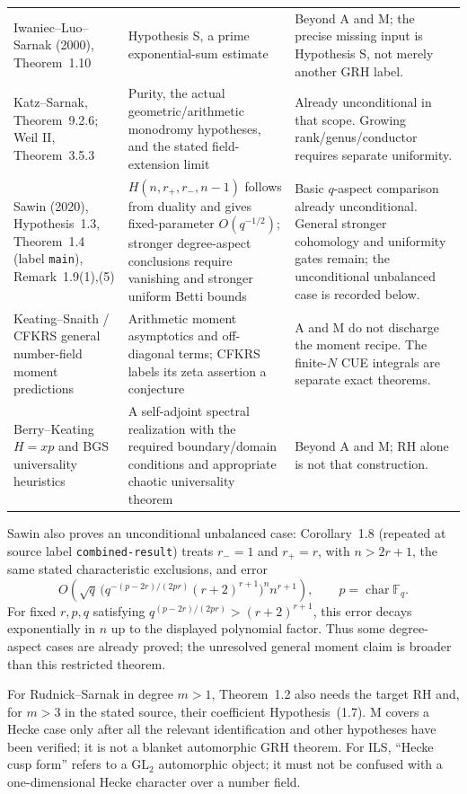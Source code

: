 \begin{longtable}{p{}p{}p{}}
Iwaniec--Luo--Sarnak (2000), Theorem~1.10 & Hypothesis S, a prime exponential-sum estimate & Beyond A and M; the precise missing input is Hypothesis S, not merely another GRH label.\\
Katz--Sarnak, Theorem~9.2.6; Weil II, Theorem~3.5.3 & Purity, the actual geometric/arithmetic monodromy hypotheses, and the stated field-extension limit & Already unconditional in that scope. Growing rank/genus/conductor requires separate uniformity.\\
Sawin (2020), Hypothesis~1.3, Theorem~1.4 (label \texttt{main}), Remark~1.9(1),(5) & $H(n,r_+,r_-,n-1)$ follows from duality and gives fixed-parameter $O(q^{-1/2})$; stronger degree-aspect conclusions require vanishing and stronger uniform Betti bounds & Basic $q$-aspect comparison already unconditional. General stronger cohomology and uniformity gates remain; the unconditional unbalanced case is recorded below.\\
Keating--Snaith / CFKRS general number-field moment predictions & Arithmetic moment asymptotics and off-diagonal terms; CFKRS labels its zeta assertion a conjecture & A and M do not discharge the moment recipe. The finite-$N$ CUE integrals are separate exact theorems.\\
Berry--Keating $H=xp$ and BGS universality heuristics & A self-adjoint spectral realization with the required boundary/domain conditions and appropriate chaotic universality theorem & Beyond A and M; RH alone is not that construction.\\\hline
\end{longtable}
\endgroup

Sawin also proves an unconditional unbalanced case: Corollary~1.8 (repeated at source label \texttt{combined-result}) treats $r_-=1$ and $r_+=r$, with $n>2r+1$, the same stated characteristic exclusions, and error
\[
 O\!\left(\sqrt q\,\bigl(q^{-(p-2r)/(2pr)}(r+2)^{r+1}\bigr)^n n^{r+1}\right),
 \qquad p=\operatorname{char}\mathbb F_q.
\]
For fixed $r,p,q$ satisfying $q^{(p-2r)/(2pr)}>(r+2)^{r+1}$, this error decays exponentially in $n$ up to the displayed polynomial factor. Thus some degree-aspect cases are already proved; the unresolved general moment claim is broader than this restricted theorem.

For Rudnick--Sarnak in degree $m>1$, Theorem~1.2 also needs the target RH and, for $m>3$ in the stated source, their coefficient Hypothesis~(1.7). M covers a Hecke case only after all the relevant identification and other hypotheses have been verified; it is not a blanket automorphic GRH theorem. For ILS, ``Hecke cusp form'' refers to a $\mathrm{GL}_2$ automorphic object; it must not be confused with a one-dimensional Hecke character over a number field.

